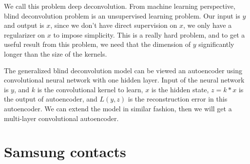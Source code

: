\documentclass[12pt]{article}
\begin{document}
We call this problem deep deconvolution. From machine learning perspective,  blind deconvolution problem is an unsupervised learning problem. 
Our input is $y$ and output is $x$, since we don't have direct supervision on $x$, we only have a regularizer on $x$ to impose simplicity. 
This is a really hard problem, and to get a useful result from this problem, we need that the dimension of $y$ significantly longer than the size of the kernels. 

 
The generalized blind deconvolution model can be viewed an autoencoder using convolutional neural network with one hidden layer. 
Input of the neural network is $y$, and $k$ is the convolutional kernel to learn, $x$ is the hidden state, $z = k*x$ is the output of autoencoder, 
and $L(y,z)$ is the reconstruction error in this autoencoder. We can extend the model in similar fashion, then we will get a multi-layer convolutional autoencoder.



\section{Samsung contacts}





\end{document}
